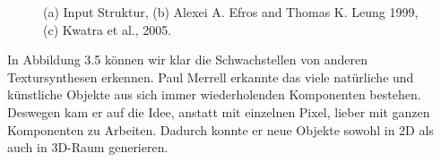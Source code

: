 \documentclass[12pt, a4paper,twoside,openright]{report}
\begin{document}
\begin{figure}[H]
    \centering
    \qquad
    \qquad
    \caption{(a) Input Struktur, (b) Alexei A. Efros and Thomas K. Leung 1999, (c) Kwatra et al., 2005. \cite{merrell2009model}}%
\end{figure}

In Abbildung 3.5 können wir klar die Schwachstellen von anderen Textursynthesen erkennen.
\newline
Paul Merrell erkannte das viele natürliche und künstliche Objekte aus sich immer wiederholenden Komponenten bestehen.
Deswegen kam er auf die Idee, anstatt mit einzelnen Pixel, lieber mit ganzen Komponenten zu Arbeiten.
Dadurch konnte er neue Objekte sowohl in 2D als auch in 3D-Raum generieren.
\end{document}
